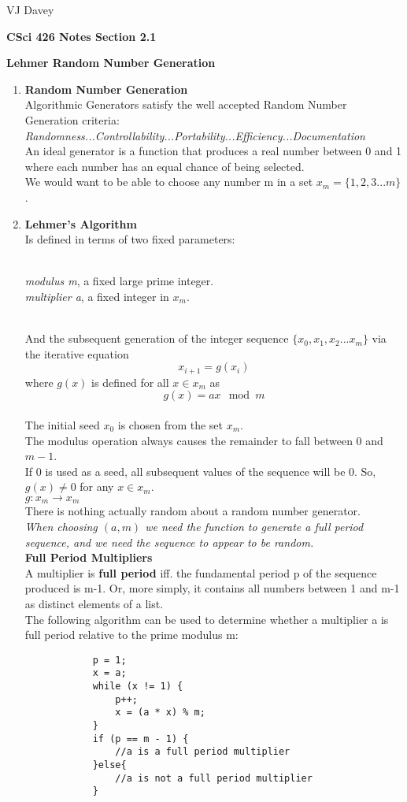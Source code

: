 \documentclass[11pt]{article}
\begin{document}
\centerline{VJ Davey}\vskip 0.10cm
\begin{LARGE}
\centerline {\bf CSci 426 Notes Section 2.1}
\end{LARGE}
\vskip 0.25cm
\centerline{\bf Lehmer Random Number Generation}
\begin{enumerate}
	\item \textbf{Random Number Generation}
		\\Algorithmic Generators satisfy the well accepted Random Number Generation criteria:
		\\\textit{Randomness...Controllability...Portability...Efficiency...Documentation}
		\\An ideal generator is a function that produces a real number between 0 and 1 where each number has an equal chance of being selected.
		\\We would want to be able to choose any number m in a set $x_m = \{1,2,3...m\}$.
	\item \textbf{Lehmer's Algorithm}
			\\Is defined in terms of two fixed parameters:
				\begin{enumerate}
					\\\textit{modulus m}, a fixed large prime integer.
					\\\textit{multiplier a}, a fixed integer in $ x_m $.
				\end{enumerate}
			\\And the subsequent generation of the integer sequence $\{x_0, x_1, x_2...x_m\}$ via the iterative equation $$x_{i+1} = g(x_i)$$ where $g(x)$ is defined for all $x\in x_m$ as $$g(x) = ax \mod{m}$$
			\\ The initial seed $x_0$ is chosen from the set $x_m$.
		\\The modulus operation always causes the remainder to fall between 0 and $m-1$.
		\\If 0 is used as a seed, all subsequent values of the sequence will be 0. So, $g(x) \neq 0$ for any  $x \in x_m$.
		\\$g: x_m \rightarrow x_m$
		\\There is nothing actually random about a random number generator. 
		\\\textit{When choosing $(a,m)$ we need the function to generate a full period sequence, and we need the sequence to appear to be random.}
		\vskip 5.5cm
		\\\textbf{Full Period Multipliers}
		\\A multiplier is \textbf{full period} iff. the fundamental period p  of the sequence produced is m-1. Or, more simply, it contains all numbers between 1 and m-1 as distinct elements of a list.
		\\The following algorithm can be used to determine whether a multiplier a is full period relative to the prime modulus m:
		\begin{verbatim}
			p = 1;
			x = a;
			while (x != 1) {
			    p++;
			    x = (a * x) % m;
			}
			if (p == m - 1) {
		        //a is a full period multiplier
			}else{
			    //a is not a full period multiplier
			}
		\end{verbatim}
\end{enumerate}
\end{document}
